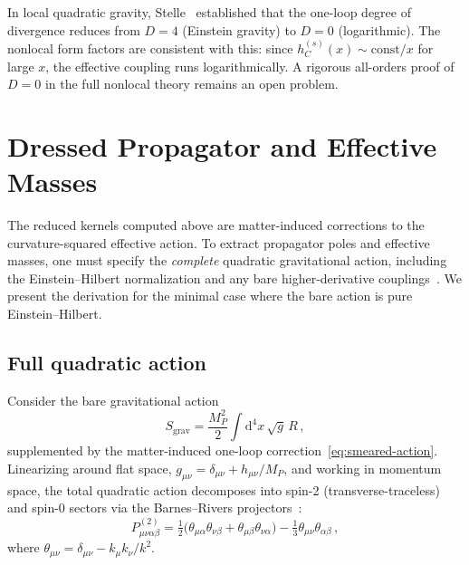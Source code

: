 \documentclass[aps,prd,twocolumn,superscriptaddress,nofootinbib,floatfix]{revtex4-2}
\theoremstyle{definition}
\theoremstyle{remark}
\newcommand{\dd}{\mathrm{d}}
\begin{document}
In local quadratic gravity, Stelle~\cite{Stelle:1976gc} established that the
one-loop degree of divergence reduces from $D = 4$ (Einstein gravity) to
$D = 0$ (logarithmic). The nonlocal form factors are consistent with this:
since $h_C^{(s)}(x) \sim \text{const}/x$ for large $x$, the effective
coupling runs logarithmically. A rigorous all-orders proof of $D = 0$ in the
full nonlocal theory remains an open problem.


\section{Dressed Propagator and Effective Masses}
\label{sec:propagator}

The reduced kernels computed above are matter-induced corrections to the
curvature-squared effective action. To extract propagator poles and effective
masses, one must specify the \emph{complete} quadratic gravitational action,
including the Einstein--Hilbert normalization and any bare higher-derivative
couplings~\cite{Stelle:1976gc,Stelle:1977ry,Buchbinder:1992rb}. We present
the derivation for the minimal case where the bare action is pure
Einstein--Hilbert.

\subsection{Full quadratic action}

Consider the bare gravitational action
\begin{equation}
  S_{\text{grav}} = \frac{M_P^2}{2}\int \dd^4x\,\sqrt{g}\,R\,,
  \label{eq:EH}
\end{equation}
supplemented by the matter-induced one-loop correction~\eqref{eq:smeared-action}. Linearizing around flat space,
$g_{\mu\nu} = \delta_{\mu\nu} + h_{\mu\nu}/M_P$, and working in momentum
space, the total quadratic action decomposes into spin-2 (transverse-traceless)
and spin-0 sectors via the Barnes--Rivers
projectors~\cite{Barnes:1965,Rivers:1964}:
\begin{equation}
  P^{(2)}_{\mu\nu\alpha\beta} = \tfrac{1}{2}\bigl(
    \theta_{\mu\alpha}\theta_{\nu\beta} + \theta_{\mu\beta}\theta_{\nu\alpha}
  \bigr) - \tfrac{1}{3}\theta_{\mu\nu}\theta_{\alpha\beta}\,,
  \label{eq:BR-P2}
\end{equation}
where $\theta_{\mu\nu} = \delta_{\mu\nu} - k_\mu k_\nu/k^2$.
\end{document}
